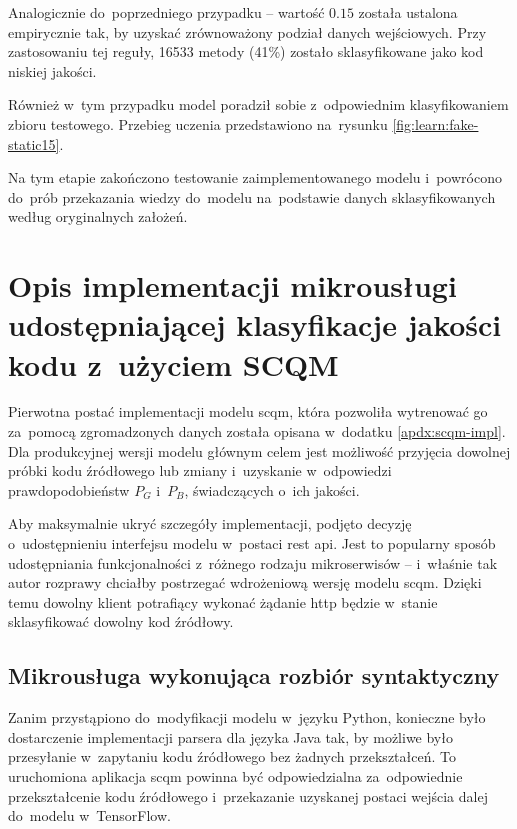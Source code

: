 \documentclass[twoside]{praca}
\begin{document}
Analogicznie do~poprzedniego przypadku -- wartość $0.15$ została ustalona empirycznie tak, by uzyskać zrównoważony podział danych wejściowych. Przy zastosowaniu tej reguły, 16533 metody (41\%) zostało sklasyfikowane jako kod niskiej jakości.

Również w~tym przypadku model poradził sobie z~odpowiednim klasyfikowaniem zbioru testowego. Przebieg uczenia przedstawiono na~rysunku \ref{fig:learn:fake-static15}. 

Na tym etapie zakończono testowanie zaimplementowanego modelu i~powrócono do~prób przekazania wiedzy do~modelu na~podstawie danych sklasyfikowanych według oryginalnych założeń.

\clearpage
\section{Opis implementacji mikrousługi udostępniającej klasyfikacje jakości kodu z~użyciem SCQM}
\label{apdx:scqm-docker}
\setcounter{table}{0}
\renewcommand{\thetable}{E.\arabic{table}}
\setcounter{figure}{0}
\renewcommand{\thefigure}{E.\arabic{figure}}
\setcounter{lstlisting}{0}
\renewcommand{\thelstlisting}{E.\arabic{lstlisting}}

Pierwotna postać implementacji modelu \gls{scqm}, która pozwoliła wytrenować go za~pomocą zgromadzonych danych została opisana w~dodatku \ref{apdx:scqm-impl}. Dla produkcyjnej wersji modelu głównym celem jest możliwość przyjęcia dowolnej próbki kodu źródłowego lub zmiany i~uzyskanie w~odpowiedzi prawdopodobieństw $P_G$ i~$P_B$, świadczących o~ich jakości.

Aby maksymalnie ukryć szczegóły implementacji, podjęto decyzję o~udostępnieniu interfejsu modelu w~postaci \gls{rest} \gls{api}. Jest to popularny sposób udostępniania funkcjonalności z~różnego rodzaju mikroserwisów -- i~właśnie tak autor rozprawy chciałby postrzegać wdrożeniową wersję modelu \gls{scqm}. Dzięki temu dowolny klient potrafiący wykonać żądanie \gls{http} będzie w~stanie sklasyfikować dowolny kod źródłowy.

\subsection{Mikrousługa wykonująca rozbiór syntaktyczny}

Zanim przystąpiono do~modyfikacji modelu w~języku Python, konieczne było dostarczenie implementacji parsera dla języka Java tak, by możliwe było przesyłanie w~zapytaniu kodu źródłowego bez żadnych przekształceń. To uruchomiona aplikacja \gls{scqm} powinna być odpowiedzialna za~odpowiednie przekształcenie kodu źródłowego i~przekazanie uzyskanej postaci wejścia dalej do~modelu w~TensorFlow.
\end{document}
